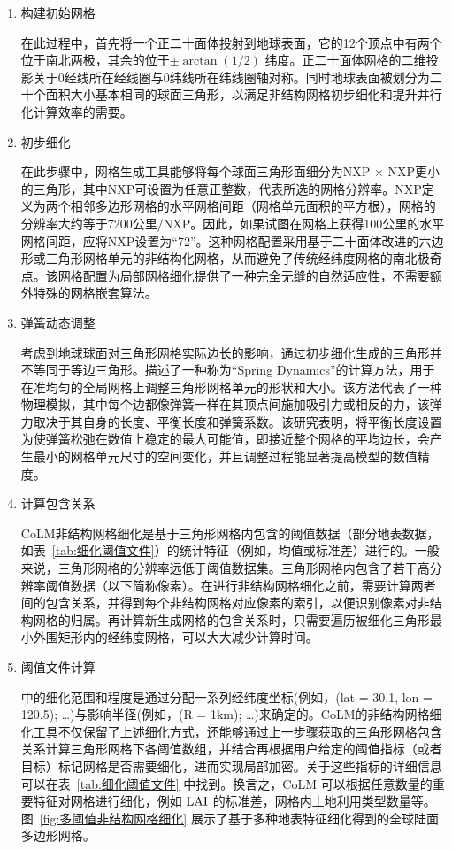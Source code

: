 \begin{enumerate}[label=\alph*)]
  \item 构建初始网格

    在此过程中，首先将一个正二十面体投射到地球表面，它的12个顶点中有两个位于南北两极，其余的位于$\pm\arctan(1/2)$ 纬度。正二十面体网格的二维投影关于0\textdegree 经线所在经线圈与0\textdegree 纬线所在纬线圈轴对称。同时地球表面被划分为二十个面积大小基本相同的球面三角形，以满足非结构网格初步细化和提升并行化计算效率的需要。

  \item 初步细化

    在此步骤中，网格生成工具能够将每个球面三角形面细分为NXP $\times$ NXP更小的三角形，其中NXP可设置为任意正整数，代表所选的网格分辨率。NXP定义为两个相邻多边形网格的水平网格间距（网格单元面积的平方根），网格的分辨率大约等于7200公里/NXP。因此，如果试图在网格上获得100公里的水平网格间距，应将NXP设置为“72”。这种网格配置采用基于二十面体改进的六边形或三角形网格单元的非结构化网格，从而避免了传统经纬度网格的南北极奇点。该网格配置为局部网格细化提供了一种完全无缝的自然适应性，不需要额外特殊的网格嵌套算法。

  \item 弹簧动态调整

    考虑到地球球面对三角形网格实际边长的影响，通过初步细化生成的三角形并不等同于等边三角形。\citet{tomita2002optimization}描述了一种称为“Spring Dynamics”的计算方法，用于在准均匀的全局网格上调整三角形网格单元的形状和大小。该方法代表了一种物理模拟，其中每个边都像弹簧一样在其顶点间施加吸引力或相反的力，该弹力取决于其自身的长度、平衡长度和弹簧系数。该研究表明，将平衡长度设置为使弹簧松弛在数值上稳定的最大可能值，即接近整个网格的平均边长，会产生最小的网格单元尺寸的空间变化，并且调整过程能显著提高模型的数值精度。

  \item 计算包含关系

    CoLM非结构网格细化是基于三角形网格内包含的阈值数据（部分地表数据，如表~\ref{tab:细化阈值文件}）的统计特征（例如，均值或标准差）进行的。一般来说，三角形网格的分辨率远低于阈值数据集。三角形网格内包含了若干高分辨率阈值数据（以下简称像素）。在进行非结构网格细化之前，需要计算两者间的包含关系，并得到每个非结构网格对应像素的索引，以便识别像素对非结构网格的归属。再计算新生成网格的包含关系时，只需要遍历被细化三角形最小外围矩形内的经纬度网格，可以大大减少计算时间。

  \item 阈值文件计算


    \citet{walko_direct_2011} 中的细化范围和程度是通过分配一系列经纬度坐标(例如，(lat = 30.1, lon = 120.5); \dots)与影响半径(例如，(R = 1km); \dots)来确定的。CoLM的非结构网格细化工具不仅保留了上述细化方式，还能够通过上一步骤获取的三角形网格包含关系计算三角形网格下各阈值数组，并结合再根据用户给定的阈值指标（或者目标）标记网格是否需要细化，进而实现局部加密。关于这些指标的详细信息可以在表~\ref{tab:细化阈值文件} 中找到。换言之，CoLM 可以根据任意数量的重要特征对网格进行细化，例如 ${\rm LAI}$ 的标准差，网格内土地利用类型数量等。图~\ref{fig:多阈值非结构网格细化} 展示了基于多种地表特征细化得到的全球陆面多边形网格。


\end{enumerate}
